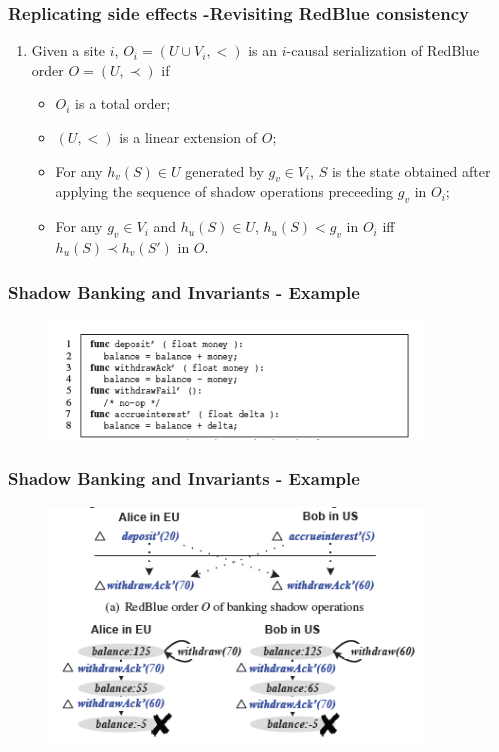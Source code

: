 \documentclass{beamer}
\begin{document}

\begin{frame}
\frametitle{Replicating side effects -Revisiting RedBlue consistency}
\begin{enumerate}
\item Given a site $i$, $O_i = (U \cup V_i, <)$ is an $i$-causal serialization of RedBlue order $O = (U , \prec)$ if
\begin{itemize}
\item $O_i$ is a total order;
\item $(U,<)$ is a linear extension of $O$;
\item For any $h_v(S) \in U$ generated by $g_v \in V_i$, $S$ is the state obtained after applying the sequence of shadow operations preceeding $g_v$ in $O_i$;
\item For any $g_v \in V_i$ and $h_u(S) \in U$, $h_u(S) < g_v$ in $O_i$ iff $h_u(S) \prec h_v(S')$ in $O$.
\end{itemize}

\end{enumerate}

\end{frame}



\begin{frame}
\frametitle{Shadow Banking and Invariants - Example}
\begin{figure}[t]
\includegraphics[width=10cm]{pic6.jpg}
\centering
\end{figure}

\end{frame}


\begin{frame}
\frametitle{Shadow Banking and Invariants - Example}
\begin{figure}[t]
\includegraphics[width=10cm]{pic7.jpg}
\centering
\end{figure}

\end{frame}
\end{document}
